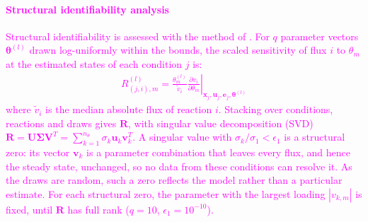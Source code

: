 \documentclass[conference]{IEEEtran}
\begin{document}
\paragraph{\textcolor{magenta}{Structural identifiability analysis}}
\textcolor{magenta}{Structural identifiability is assessed with the method of \textcite{stigter2015fast}. For $q$ parameter vectors $\boldsymbol{\theta}^{(l)}$ drawn log-uniformly within the bounds, the scaled sensitivity of flux $i$ to $\theta_m$ at the estimated states of each condition $j$ is:
\begin{align}
    R_{(j,i),m}^{(l)} = \left.\frac{\theta_m^{(l)}}{\widetilde{v}_{i}}\frac{\partial v_i}{\partial \theta_m}\right\vert_{\mathbf{x}_j, \mathbf{u}_j, \mathbf{e}_j, \boldsymbol{\theta}^{(l)}}
    \label{eqn: R}
\end{align}
where $\widetilde{v}_{i}$ is the median absolute flux of reaction $i$. Stacking over conditions, reactions and draws gives $\mathbf{R}$, with singular value decomposition (SVD) $
\mathbf{R} = \mathbf{U}\boldsymbol{\Sigma}\mathbf{V}^T = \sum_{k=1}^{n_\theta} \sigma_k \mathbf{u}_k \mathbf{v}_k^T$.
A singular value with $\sigma_k/\sigma_1 < \epsilon_1$ is a structural zero: its vector $\mathbf{v}_k$ is a parameter combination that leaves every flux, and hence the steady state, unchanged, so no data from these conditions can resolve it. As the draws are random, such a zero reflects the model rather than a particular estimate. For each structural zero, the parameter with the largest loading $|v_{k,m}|$ is fixed, until $\mathbf{R}$ has full rank ($q = 10$, $\epsilon_1 = 10^{-10}$).}
\end{document}
